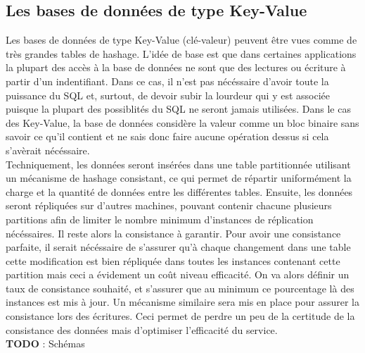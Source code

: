 \documentclass[11pt]{article}
\begin{document}
\subsection{Les bases de données de type Key-Value}
Les bases de données de type Key-Value (clé-valeur) peuvent être vues comme de très grandes tables de hashage. L'idée de base est que dans certaines applications la plupart des accès à la base de données ne sont que des lectures ou écriture à partir d'un indentifiant. Dans ce cas, il n'est pas nécéssaire d'avoir toute la puissance du SQL et, surtout, de devoir subir la lourdeur qui y est associée puisque la plupart des possiblités du SQL ne seront jamais utilisées. Dans le cas des Key-Value, la base de données considère la valeur comme un bloc binaire sans savoir ce qu'il contient et ne sais donc faire aucune opération dessus si cela s'avèrait nécéssaire. \\
Techniquement, les données seront insérées dans une table partitionnée utilisant un mécanisme de hashage consistant, ce qui permet de répartir uniformément la charge et la quantité de données entre les différentes tables. Ensuite, les données seront répliquées sur d'autres machines, pouvant contenir chacune plusieurs partitions afin de limiter le nombre minimum d'instances de réplication nécéssaires. Il reste alors la consistance à garantir. Pour avoir une consistance parfaite, il serait nécéssaire de s'assurer qu'à chaque changement dans une table cette modification est bien répliquée dans toutes les instances contenant cette partition mais ceci a évidement un coût niveau efficacité. On va alors définir un taux de consistance souhaité, et s'assurer que au minimum ce pourcentage là des instances est mis à jour. Un mécanisme similaire sera mis en place pour assurer la consistance lors des écritures. Ceci permet de perdre un peu de la certitude de la consistance des données mais d'optimiser l'efficacité du service. \\
\textbf{TODO} : Schémas
\end{document}
